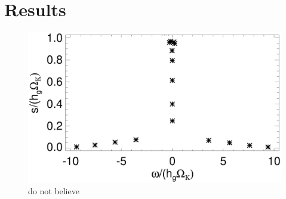 \section{Results}

\begin{figure}
\includegraphics[width=\linewidth]{figures/eigenvalues}
\caption{do not believe}
\end{figure}
